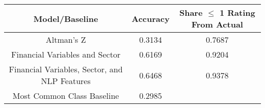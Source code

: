 \tiny
\begin{tabular}{ccc}
\toprule
Model/Baseline & Accuracy & Share $\le$ 1 Rating From Actual \\
\midrule
Altman's Z & 0.3134 & 0.7687 \\
Financial Variables and Sector & 0.6169 & 0.9204 \\
Financial Variables, Sector, and NLP Features & 0.6468 & 0.9378 \\
Most Common Class Baseline & 0.2985 &  \\
\bottomrule
\end{tabular}

\normalsize